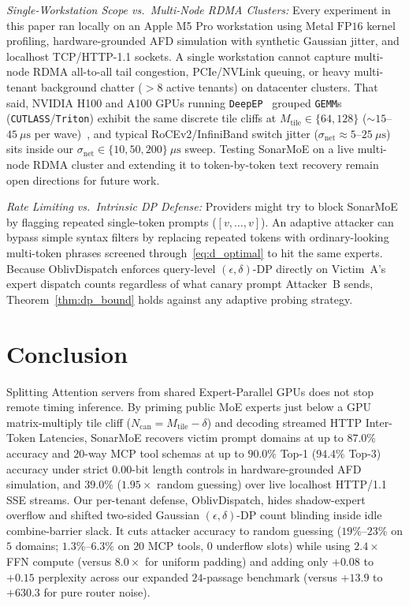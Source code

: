 \documentclass[11pt,a4paper]{article}
\renewcommand{\_}{\textunderscore\allowbreak}
\def\SM{SonarMoE}%
\def\OD{OblivDispatch}%
\theoremstyle{definition}
\theoremstyle{remark}
\newcommand{\SM}{\textsc{SonarMoE}}
\newcommand{\OD}{\textsc{OblivDispatch}}
\begin{document}
\emph{Single-Workstation Scope vs.\ Multi-Node RDMA Clusters:} Every experiment in this paper ran locally on an Apple M5 Pro workstation using Metal $\mathrm{FP16}$ kernel profiling, hardware-grounded AFD simulation with synthetic Gaussian jitter, and localhost TCP/HTTP-1.1 sockets. A single workstation cannot capture multi-node RDMA all-to-all tail congestion, PCIe/NVLink queuing, or heavy multi-tenant background chatter ($>8$ active tenants) on datacenter clusters. That said, NVIDIA H100 and A100 GPUs running \texttt{DeepEP}~\cite{zhao2025deepep} grouped \texttt{GEMM}s (\texttt{CUTLASS}/\texttt{Triton}) exhibit the same discrete tile cliffs at $M_{\mathrm{tile}} \in \{64, 128\}$ ($\sim 15$--$45~\mu\mathrm{s}$ per wave)~\cite{tan2025gpugemmcliff}, and typical RoCEv2/InfiniBand switch jitter ($\sigma_{\mathrm{net}} \approx 5$--$25~\mu\mathrm{s}$) sits inside our $\sigma_{\mathrm{net}} \in \{10, 50, 200\}~\mu\mathrm{s}$ sweep. Testing \SM{} on a live multi-node RDMA cluster and extending it to token-by-token text recovery remain open directions for future work.

\emph{Rate Limiting vs.\ Intrinsic DP Defense:} Providers might try to block \SM{} by flagging repeated single-token prompts ($[v, \dots, v]$). An adaptive attacker can bypass simple syntax filters by replacing repeated tokens with ordinary-looking multi-token phrases screened through~\eqref{eq:d_optimal} to hit the same experts. Because \OD{} enforces query-level $(\epsilon, \delta)$-DP directly on Victim~A's expert dispatch counts regardless of what canary prompt Attacker~B sends, Theorem~\ref{thm:dp_bound} holds against any adaptive probing strategy.

\section{Conclusion}\label{sec:conclusion}

Splitting Attention servers from shared Expert-Parallel GPUs does not stop remote timing inference. By priming public MoE experts just below a GPU matrix-multiply tile cliff ($N_{\mathrm{can}} = M_{\mathrm{tile}} - \delta$) and decoding streamed HTTP Inter-Token Latencies, \SM{} recovers victim prompt domains at up to $87.0\%$ accuracy and $20$-way MCP tool schemas at up to $90.0\%$ Top-1 ($94.4\%$ Top-3) accuracy under strict $0.00$-bit length controls in hardware-grounded AFD simulation, and $39.0\%$ ($1.95\times$ random guessing) over live localhost HTTP/1.1 SSE streams. Our per-tenant defense, \OD{}, hides shadow-expert overflow and shifted two-sided Gaussian $(\epsilon, \delta)$-DP count blinding inside idle combine-barrier slack. It cuts attacker accuracy to random guessing ($19\%$--$23\%$ on $5$ domains; $1.3\%$--$6.3\%$ on $20$ MCP tools, $0$ underflow slots) while using $2.4\times$ FFN compute (versus $8.0\times$ for uniform padding) and adding only $+0.08$ to $+0.15$ perplexity across our expanded $24$-passage benchmark (versus $+13.9$ to $+630.3$ for pure router noise).
\end{document}
